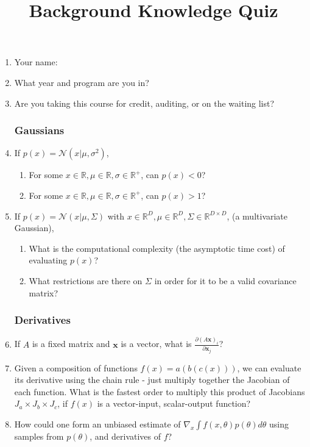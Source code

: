 \documentclass[12pt]{article}
\title{\vspace{-4ex}Background Knowledge Quiz}
\date{\vspace{-4ex}}
\newcommand{\vx}{{\mathbf{x}}}
\begin{document}

\maketitle

\begin{enumerate}
\item Your name:
\item What year and program are you in?
\item Are you taking this course for credit, auditing, or on the waiting list?
\subsubsection*{Gaussians}
\item If $p(x) = \mathcal{N}(x | \mu, \sigma^2)$,
\begin{enumerate}
\item For some $x \in \mathbb{R}, \mu \in \mathbb{R}, \sigma \in \mathbb{R}^+$, can $p(x) < 0$?
\item For some $x \in \mathbb{R}, \mu \in \mathbb{R}, \sigma \in \mathbb{R}^+$, can $p(x) > 1$?
\end{enumerate}
\item If $p(x) = \mathcal{N}(x | \mu, \Sigma)$ with $x \in \mathbb{R}^D, \mu \in \mathbb{R}^D, \Sigma \in \mathbb{R}^{D\times D}$, (a multivariate Gaussian),
\begin{enumerate}
\item What is the computational complexity (the asymptotic time cost) of evaluating $p(x)$?
\item What restrictions are there on $\Sigma$ in order for it to be a valid covariance matrix?
\end{enumerate}
\subsubsection*{Derivatives}
\item If $A$ is a fixed matrix and $\vx$ is a vector, what is $\frac{\partial (A \vx)_i}{\partial \vx_j}$?
\item Given a composition of functions $f(x) = a(b(c(x)))$, we can evaluate its derivative using the chain rule - just multiply together the Jacobian of each function.
What is the fastest order to multiply this product of Jacobians $J_a \times J_b \times J_c$, if $f(x)$ is a vector-input, scalar-output function?\vspace{0.5cm}
\item How could one form an unbiased estimate of $\nabla_x \int f(x, \theta) p(\theta) d\theta$ using samples from $p(\theta)$, and derivatives of $f$?

\end{enumerate}
\end{document}
